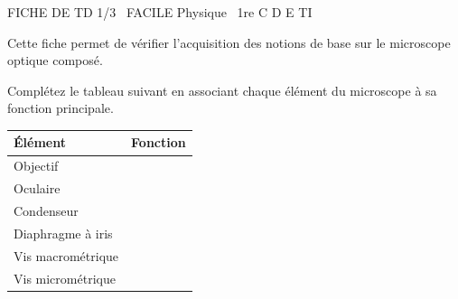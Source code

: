 \documentclass[11pt]{article}
\begin{document}
\begin{tcolorbox}[enhanced,colback=popink,colframe=popink,arc=10pt,boxrule=0pt,left=12pt,right=12pt,top=9pt,bottom=9pt]
{\color{white}\popxbold\small FICHE DE TD 1/3 \textbullet\ FACILE \hfill Physique \textbullet\ 1re C D E TI\par}
\end{tcolorbox}
\vspace{4pt}
Cette fiche permet de vérifier l'acquisition des notions de base sur le microscope optique composé.

\begin{exercice}
\label{exo:vocab}
Complétez le tableau suivant en associant chaque élément du microscope à sa fonction principale.
\begin{center}
\begin{tabular}{|l|l|}
\hline
\textbf{Élément} & \textbf{Fonction} \\
\hline
Objectif & \dotfill \\
\hline
Oculaire & \dotfill \\
\hline
Condenseur & \dotfill \\
\hline
Diaphragme à iris & \dotfill \\
\hline
Vis macrométrique & \dotfill \\
\hline
Vis micrométrique & \dotfill \\
\hline
\end{tabular}
\end{center}
\end{exercice}
\end{document}
